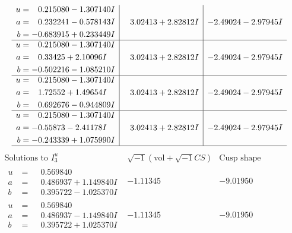 \documentclass[1p]{elsarticle_modified}
\theoremstyle{definition}
\newcommand{\I}{\sqrt{-1}}
\begin{document}
$$\begin{array}{c|c|c}
\begin{aligned}
u &= \phantom{-}0.215080 - 1.307140 I \\
a &= \phantom{-}0.232241 - 0.578143 I \\
b &= -0.683915 + 0.233449 I\end{aligned}
 & \phantom{-}3.02413 + 2.82812 I & -2.49024 - 2.97945 I \\ \hline\begin{aligned}
u &= \phantom{-}0.215080 - 1.307140 I \\
a &= \phantom{-}0.33425 + 2.10096 I \\
b &= -0.502216 - 1.085210 I\end{aligned}
 & \phantom{-}3.02413 + 2.82812 I & -2.49024 - 2.97945 I \\ \hline\begin{aligned}
u &= \phantom{-}0.215080 - 1.307140 I \\
a &= \phantom{-}1.72552 + 1.49654 I \\
b &= \phantom{-}0.692676 - 0.944809 I\end{aligned}
 & \phantom{-}3.02413 + 2.82812 I & -2.49024 - 2.97945 I \\ \hline\begin{aligned}
u &= \phantom{-}0.215080 - 1.307140 I \\
a &= -0.55873 - 2.41178 I \\
b &= -0.243339 + 1.075990 I\end{aligned}
 & \phantom{-}3.02413 + 2.82812 I & -2.49024 - 2.97945 I\\
 \hline 
 \end{array}$$\newpage$$\begin{array}{c|c|c}  
\text{Solutions to }I^u_{3}& \I (\text{vol} + \sqrt{-1}CS) & \text{Cusp shape}\\
 \hline 
\begin{aligned}
u &= \phantom{-}0.569840\phantom{ +0.000000I} \\
a &= \phantom{-}0.486937 + 1.149840 I \\
b &= \phantom{-}0.395722 - 1.025370 I\end{aligned}
 & -1.11345\phantom{ +0.000000I} & -9.01950\phantom{ +0.000000I} \\ \hline\begin{aligned}
u &= \phantom{-}0.569840\phantom{ +0.000000I} \\
a &= \phantom{-}0.486937 - 1.149840 I \\
b &= \phantom{-}0.395722 + 1.025370 I\end{aligned}
 & -1.11345\phantom{ +0.000000I} & -9.01950\phantom{ +0.000000I} \\ \hline\begin{aligned}

\end{aligned}
\end{array}$$
\end{document}
